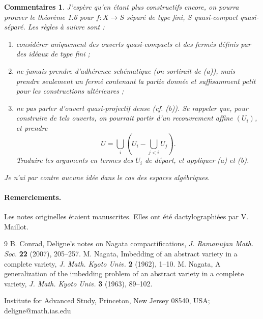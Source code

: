 \documentclass[11pt]{article}
\newtheorem*{comments}{Commentaires}
\begin{document}
\begin{comments}
J'espère qu'en étant plus constructifs encore, on pourra prouver le théorème 1.6 pour \(f:X\to S\) séparé de type fini, \(S\) quasi-compact quasi-séparé. Les règles à suivre sont :
\begin{enumerate}[label=(\alph*)]
\item considérer uniquement des ouverts quasi-compacts et des fermés définis par des idéaux de type fini ;
\item ne jamais prendre d'adhérence schématique (on sortirait de (a)), mais prendre seulement un fermé contenant la partie donnée et suffisamment petit pour les constructions ultérieures ;
\item ne pas parler d'ouvert quasi-projectif dense (cf. (b)). Se rappeler que, pour construire de tels ouverts, on pourrait partir d'un recouvrement affine \((U_i)\), et prendre
\[
U=\bigcup_i\left(U_i-\bigcup_{j<i}U_j\right).
\]
Traduire les arguments en termes des \(U_i\) de départ, et appliquer (a) et (b).
\end{enumerate}
Je n'ai par contre aucune idée dans le cas des espaces algébriques.
\end{comments}

\paragraph{Remerciements.}
Les notes originelles étaient manuscrites. Elles ont été dactylographiées par V. Maillot.

\begin{thebibliography}{9}
 B. Conrad, Deligne's notes on Nagata compactifications, \emph{J. Ramanujan Math. Soc.} \textbf{22} (2007), 205--257.
 M. Nagata, Imbedding of an abstract variety in a complete variety, \emph{J. Math. Kyoto Univ.} \textbf{2} (1962), 1--10.
 M. Nagata, A generalization of the imbedding problem of an abstract variety in a complete variety, \emph{J. Math. Kyoto Univ.} \textbf{3} (1963), 89--102.
\end{thebibliography}

\begin{center}
Institute for Advanced Study, Princeton, New Jersey 08540, USA;\\
deligne@math.ias.edu
\end{center}
\end{document}
